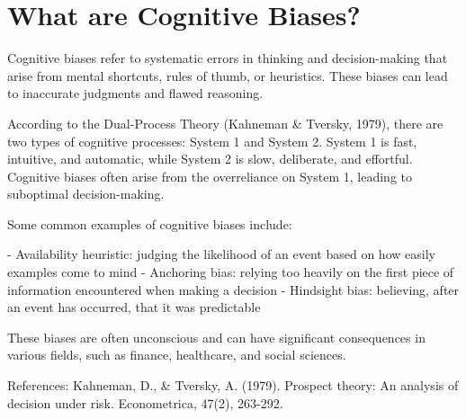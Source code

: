 \section{What are Cognitive Biases?}

Cognitive biases refer to systematic errors in thinking and decision-making that arise from mental shortcuts, rules of thumb, or heuristics. These biases can lead to inaccurate judgments and flawed reasoning.

According to the Dual-Process Theory (Kahneman & Tversky, 1979), there are two types of cognitive processes: System 1 and System 2. System 1 is fast, intuitive, and automatic, while System 2 is slow, deliberate, and effortful. Cognitive biases often arise from the overreliance on System 1, leading to suboptimal decision-making.

Some common examples of cognitive biases include:

- Availability heuristic: judging the likelihood of an event based on how easily examples come to mind
- Anchoring bias: relying too heavily on the first piece of information encountered when making a decision
- Hindsight bias: believing, after an event has occurred, that it was predictable

These biases are often unconscious and can have significant consequences in various fields, such as finance, healthcare, and social sciences.

References:
Kahneman, D., & Tversky, A. (1979). Prospect theory: An analysis of decision under risk. Econometrica, 47(2), 263-292.